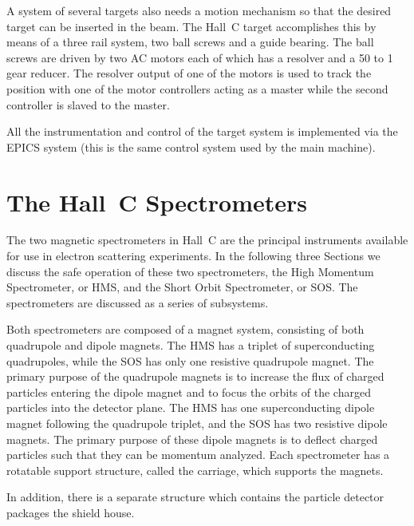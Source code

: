 A system of several targets also needs a motion mechanism so that the desired
target can be inserted in the beam. The Hall~C target accomplishes this by
means of a three rail system, two ball screws and a guide bearing.
The ball screws are driven by two AC motors each of which has a resolver and
a 50 to 1 gear reducer. The resolver output of one of the motors is used
to track the position with one of the motor controllers acting as a master
while the second controller is slaved to the master.

All the instrumentation and control of the target system is implemented
via the EPICS system (this is the same control system used by the main
machine).



\section{The Hall~C Spectrometers}


	The two magnetic spectrometers in Hall~C are the principal instruments
available for use in electron scattering experiments. In the following three
Sections we discuss the safe operation of these two spectrometers,
the High Momentum Spectrometer, or HMS,
and the Short Orbit Spectrometer, or SOS. The spectrometers are
discussed as a series of subsystems.

Both spectrometers are composed of a magnet system, consisting of both
quadrupole and dipole magnets. The HMS has a triplet of superconducting
quadrupoles, while the SOS has only one resistive quadrupole magnet.
The primary purpose of the quadrupole magnets is to increase the flux of
charged particles entering the dipole magnet and to focus the orbits of the
charged particles into the detector plane.
The HMS has one superconducting dipole magnet following the quadrupole triplet,
and the SOS has two resistive dipole magnets. The primary purpose of these
dipole magnets is to deflect charged particles such that they can be momentum
analyzed.
Each spectrometer has a rotatable support structure, called the
carriage, which supports the magnets.

In addition, there is a separate
structure which contains the particle detector packages the shield house.

